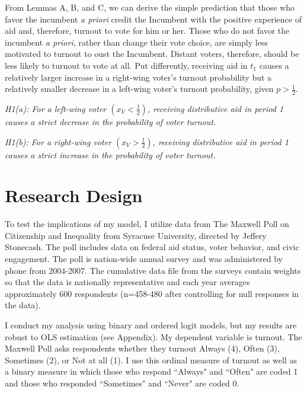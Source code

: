 \documentclass[12pt]{paper}
\begin{document}
From Lemmas A, B, and C, we can derive the simple prediction that those who favor the incumbent \emph{a priori} credit the Incumbent with the positive experience of aid and, therefore, turnout to vote for him or her. Those who do not favor the incumbent \emph{a priori}, rather than change their vote choice, are simply less motivated to turnout to oust the Incumbent. Distant voters, therefore, should be less likely to turnout to vote at all. Put differently, receiving aid in $t_1$ causes a relatively larger increase in a right-wing voter’s turnout probability but a relatively smaller decrease in a left-wing voter’s turnout probability, given $p > \frac{1}{2}$. 

\emph{H1(a): For a left-wing voter $(x_V < \frac{1}{2})$, receiving distributive aid in period 1 causes a strict decrease in the probability of voter turnout.}

\emph{H1(b): For a right-wing voter $(x_V > \frac{1}{2})$, receiving distributive aid in period 1 causes a strict increase in the probability of voter turnout.}

\section{Research Design}
To test the implications of my model, I utilize data from The Maxwell Poll on Citizenship and Inequality from Syracuse University, directed by Jeffery Stonecash. The poll includes data on federal aid status, voter behavior, and civic engagement. The poll is nation-wide annual survey and was administered by phone from 2004-2007. The cumulative data file from the surveys contain weights so that the data is nationally representative and each year averages approximately 600 respondents (n=458-480 after controlling for null responses in the data).

I conduct my analysis using binary and ordered logit models, but my results are robust to OLS estimation (see Appendix). My dependent variable is turnout. The Maxwell Poll asks respondents whether they turnout Always (4), Often (3), Sometimes (2), or Not at all (1). I use this ordinal measure of turnout as well as a binary measure in which those who respond ``Always" and ``Often" are coded 1 and those who responded ``Sometimes" and ``Never" are coded 0.
\end{document}
